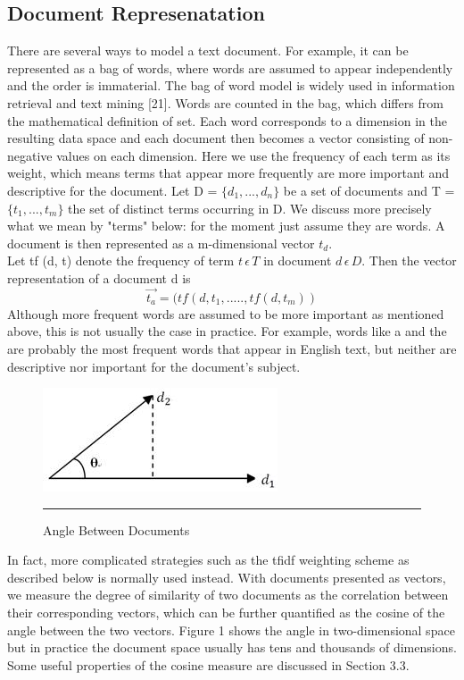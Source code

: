 \subsection{Document Represenatation}
There are several ways to model a text document. For example, it can be represented as a bag of words, where words are assumed to appear independently and the order is immaterial. The bag of word model is widely used in information retrieval and text mining [21]. Words are counted in the bag, which differs from the mathematical definition of set. Each word corresponds to a dimension in the resulting data space and each document then becomes a  vector consisting of non-negative values on each dimension. Here we use the frequency of each term as its weight, which means terms that appear more frequently are more important and descriptive for the document.
Let D = $\{d_1 , . . . , d_n \}$ be a set of documents and T = $\{t_1 , . . . ,t_m \}$ the set of distinct terms occurring in D. We discuss more precisely what we mean by "terms" below: for the moment just assume they are words. A document is then represented as a m-dimensional vector $t_d$.\\
Let tf (d, t) denote the frequency of term $t \,\epsilon\, T$ in document $d \, \epsilon\, D$. Then the vector representation of a document d is
\begin{equation}
\vec{t_{a}} = (tf(d,t_1,.....,tf(d,t_m))
\end{equation}
Although more frequent words are assumed to be more important as mentioned above, this is not usually the case in practice. For example, words like a and the are probably the most frequent words that appear in English text, but neither are descriptive nor important for the document’s subject.
\begin{figure}[htbp]
	\centering
		\includegraphics{./Figures/a.png}
		\rule{35em}{0.5pt}
	\caption[Angle Between Documents]{Angle Between Documents}
	\label{fig:Angle Between Documents}
\end{figure}
In fact, more complicated strategies such as the tfidf weighting scheme as described below is normally used instead.
With documents presented as vectors, we measure the degree of similarity of two documents as the correlation between their corresponding vectors, which can be further quantified as the cosine of the angle between the two vectors.
Figure 1 shows the angle in two-dimensional space but in practice the document space usually has tens and thousands of dimensions. Some useful properties of the cosine measure are discussed in Section 3.3.
